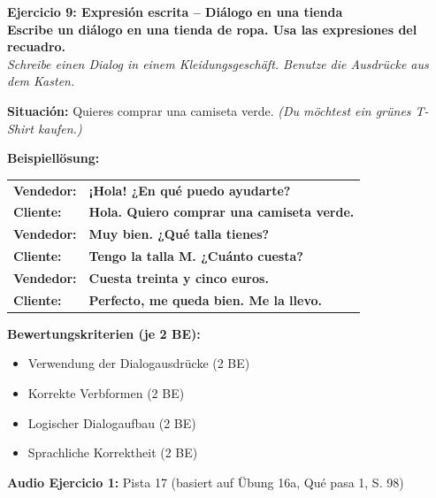 \documentclass[11pt, a4paper]{article}
\newcommand{\punktebox}[1]{\hfill\fbox{\scriptsize \_\_/#1}}
\newcommand{\lsg}[1]{\textcolor{loesung}{\textbf{#1}}}
\newcommand{\aufgabe}[3]{%
    \textbf{\textcolor{spanisch}{Ejercicio #1: #2}} \punktebox{#3}\\[2pt]
}
\newcommand{\enunciado}[2]{%
    \textbf{#1}\\[1pt]
    {\small\textit{#2}}%
}
\begin{document}
\aufgabe{9}{Expresión escrita -- Diálogo en una tienda}{8}

\enunciado{Escribe un diálogo en una tienda de ropa. Usa las expresiones del recuadro.}{Schreibe einen Dialog in einem Kleidungsgeschäft. Benutze die Ausdrücke aus dem Kasten.}

\vspace{4pt}

\textbf{Situación:} Quieres comprar una camiseta verde. \textit{(Du möchtest ein grünes T-Shirt kaufen.)}

\vspace{6pt}

\textcolor{loesung}{\textbf{Beispiellösung:}}

\vspace{4pt}

\begin{tabular}{@{}p{2.2cm}p{12.5cm}@{}}
\textbf{Vendedor:} & \lsg{¡Hola! ¿En qué puedo ayudarte?} \\[8pt]
\textbf{Cliente:} & \lsg{Hola. Quiero comprar una camiseta verde.} \\[8pt]
\textbf{Vendedor:} & \lsg{Muy bien. ¿Qué talla tienes?} \\[8pt]
\textbf{Cliente:} & \lsg{Tengo la talla M. ¿Cuánto cuesta?} \\[8pt]
\textbf{Vendedor:} & \lsg{Cuesta treinta y cinco euros.} \\[8pt]
\textbf{Cliente:} & \lsg{Perfecto, me queda bien. Me la llevo.} \\
\end{tabular}

\vspace{8pt}

{\small\textcolor{grau}{\textbf{Bewertungskriterien (je 2 BE):}
\begin{itemize}[leftmargin=15pt, itemsep=1pt]
    \item Verwendung der Dialogausdrücke (2 BE)
    \item Korrekte Verbformen (2 BE)
    \item Logischer Dialogaufbau (2 BE)
    \item Sprachliche Korrektheit (2 BE)
\end{itemize}}}

\vspace{10pt}

{\footnotesize\textcolor{grau}{\textbf{Audio Ejercicio 1:} Pista 17 (basiert auf Übung 16a, Qué pasa 1, S. 98)}}
\end{document}
